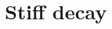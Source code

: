 \documentclass[aspectratio=169, 10pt, handout,usenames,dvipsnames]{beamer}
\begin{document}
\section{Stiff decay}\label{sec:sec11}

\end{document}
